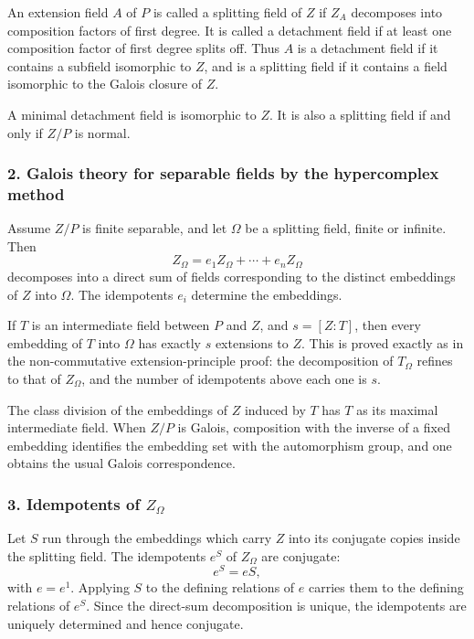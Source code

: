 \documentclass[
  11pt,
]{article}
\begin{document}
An extension field \(A\) of \(P\) is called a splitting field of \(Z\)
if \(Z_A\) decomposes into composition factors of first degree. It is
called a detachment field if at least one composition factor of first
degree splits off. Thus \(A\) is a detachment field if it contains a
subfield isomorphic to \(Z\), and is a splitting field if it contains a
field isomorphic to the Galois closure of \(Z\).

A minimal detachment field is isomorphic to \(Z\). It is also a
splitting field if and only if \(Z/P\) is normal.

\subsubsection{2. Galois theory for separable fields by the hypercomplex
method}\label{galois-theory-for-separable-fields-by-the-hypercomplex-method}

Assume \(Z/P\) is finite separable, and let \(\Omega\) be a splitting
field, finite or infinite. Then \[
  Z_\Omega=e_1Z_\Omega+
\cdots+e_nZ_\Omega
\] decomposes into a direct sum of fields corresponding to the distinct
embeddings of \(Z\) into \(\Omega\). The idempotents \(e_i\) determine
the embeddings.

If \(T\) is an intermediate field between \(P\) and \(Z\), and
\(s=[Z:T]\), then every embedding of \(T\) into \(\Omega\) has exactly
\(s\) extensions to \(Z\). This is proved exactly as in the
non-commutative extension-principle proof: the decomposition of
\(T_\Omega\) refines to that of \(Z_\Omega\), and the number of
idempotents above each one is \(s\).

The class division of the embeddings of \(Z\) induced by \(T\) has \(T\)
as its maximal intermediate field. When \(Z/P\) is Galois, composition
with the inverse of a fixed embedding identifies the embedding set with
the automorphism group, and one obtains the usual Galois correspondence.

\subsubsection{\texorpdfstring{3. Idempotents of
\(Z_\Omega\)}{3. Idempotents of Z\_\textbackslash Omega}}\label{idempotents-of-z_omega}

Let \(S\) run through the embeddings which carry \(Z\) into its
conjugate copies inside the splitting field. The idempotents \(e^S\) of
\(Z_\Omega\) are conjugate: \[
  e^S=eS,
\] with \(e=e^1\). Applying \(S\) to the defining relations of \(e\)
carries them to the defining relations of \(e^S\). Since the direct-sum
decomposition is unique, the idempotents are uniquely determined and
hence conjugate.
\end{document}
